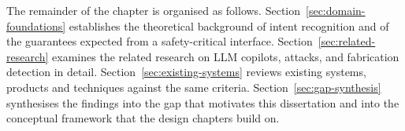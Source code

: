 The remainder of the chapter is organised as follows.
Section~\ref{sec:domain-foundations} establishes the theoretical background of
intent recognition and of the guarantees expected from a safety-critical
interface. Section~\ref{sec:related-research} examines the related research on
LLM copilots, attacks, and fabrication detection in detail.
Section~\ref{sec:existing-systems} reviews existing systems, products and
techniques against the same criteria. Section~\ref{sec:gap-synthesis} synthesises
the findings into the gap that motivates this dissertation and into the
conceptual framework that the design chapters build on.

